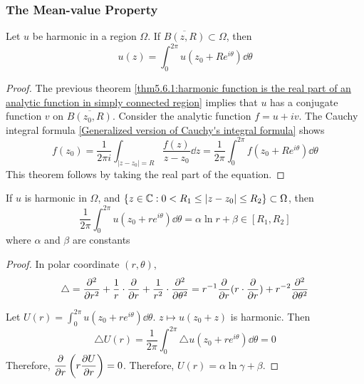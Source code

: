 \subsubsection{The Mean-value Property}

\begin{theorem}\label{thm:5.6.2:mean-value property}
    Let  $ u  $ be harmonic in a region  $ \Omega  $. If  $ \overline{B(z,R)}\subset \Omega $, then 
    \begin{equation}
        u(z)=\int_0^{2\pi }u(z_0+Re^{i\theta})\dd \theta\label{eq:5.6.2:mean-value property}
    \end{equation} 
\end{theorem}
\begin{proof}
    The previous theorem \ref{thm5.6.1:harmonic function is the real part of an analytic function in simply connected region} implies that  $ u  $ has a conjugate function  $ v  $ on  $ \overline{B(z_0,R)} $. Consider the analytic function  $ f=u+iv $. The Cauchy integral formula \ref{Generalized version of Cauchy's integral formula}  shows 
    \begin{equation}
        f(z_0)=\frac{1}{2\pi i}\int_{|z-z_0|=R}\frac{f(z)}{z-z_0}\dd z=\frac{1 }{2\pi }\int_0^{2\pi }f(z_0+Re^{i\theta})\dd \theta
    \end{equation}
    This theorem follows by taking the real part of the equation.
\end{proof}
\begin{theorem}\label{thm:5.6.2:equation of mean value  property for more general harmonic function in a cirque}
    If  $ u  $ is harmonic in  $ \Omega $, and  $ \{z\in\mathbb C:0<R_1 \leq |z-z_0| \leq R_2\}\subset \Omega $, then 
    \begin{equation}
        \frac{1 }{2\pi }\int_0^{2\pi }u(z_0+re^{i\theta})\dd\theta=\alpha\ln r+\beta\in [R_1,R_2]
    \end{equation}  
    where  $ \alpha $ and  $ \beta $ are constants  
\end{theorem}
\begin{proof}
    In polar coordinate  $ (r,\theta) $,  \[ \displaystyle\triangle=\frac{\partial^2 }{\partial r^2}+\frac{1}{r}\cdot\frac{\partial }{\partial r} +\frac{1}{r^2}\cdot\frac{\partial^2 }{\partial \theta^2}=r^{-1}\frac{\partial }{\partial r}(r\cdot\frac{\partial }{\partial r})+r^{-2}\frac{\partial ^2}{\partial \theta^2}\]

    Let  $ U(r)=\int_0^{2\pi }u(z_0+re^{i\theta})\dd\theta $.  $ z\mapsto u(z_0+z) $ is harmonic. Then 
    \begin{equation}
        \triangle U(r)=\frac{1}{2\pi }\int_0^{2\pi }\triangle u(z_0+re^{i\theta})\dd \theta=0
    \end{equation} 
    Therefore,  $ \displaystyle\frac{\partial }{\partial r}\left(r\frac{\partial U}{\partial r}\right)=0 $. Therefore,
     $ U(r)=\alpha\ln \gamma+\beta $.  
\end{proof}
